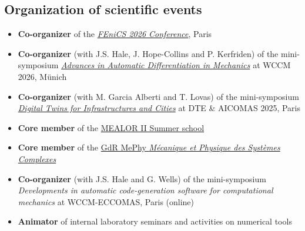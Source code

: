 \subsection*{Organization of scientific events}
\begin{itemize}[noitemsep]
\item[2026]  \textbf{Co-organizer} of the \href{https://fenicsproject.org/fenics-2026/}{\textit{FEniCS 2026 Conference}}, Paris
\item[2026] \textbf{Co-organizer} (with J.S. Hale, J. Hope-Collins and P. Kerfriden) of the mini-symposium \href{https://wccm-eccomas2026.org/event/area/847a2b99-ab83-11f0-bce5-000c29ddfc0c}{\textit{Advances in Automatic Differentiation in Mechanics}} at WCCM 2026, Münich
\item[2025] \textbf{Co-organizer} (with M. Garcia Alberti and T. Lovas) of the mini-symposium \href{https://dte_aicomas_2025.iacm.info/event/area/8d6999de-710a-11ef-a6b7-000c29ddfc0c}{\textit{Digital Twins for Infrastructures and Cities}} at DTE \& AICOMAS 2025, Paris
\item[2023] \textbf{Core member} of the \href{https://mealor2.sciencesconf.org/}{MEALOR II Summer school}
\item[since 2021] \textbf{Core member} of the \href{https://mephysociety.wordpress.com/}{GdR MePhy \textit{Mécanique et Physique des Systèmes Complexes}}
\item[2020] \textbf{Co-organizer} (with J.S. Hale and G. Wells) of the mini-symposium \textit{Developments in automatic code-generation software for computational mechanics} at WCCM-ECCOMAS, Paris (online)
\item[] \textbf{Animator} of internal laboratory seminars and activities on numerical tools
\end{itemize}

